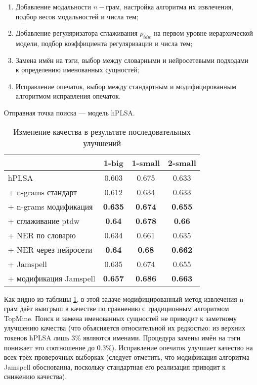 \begin{enumerate}
    \item Добавление модальности $n-$грам, настройка алгоритма их извлечения, подбор весов модальностей и числа тем;
    \item Добавление регуляризатора сглаживания $p_{tdw}$ на первом уровне иерархической модели, подбор коэффициента регуляризации и числа тем;
    \item Замена имён на тэги, выбор между словарными и нейросетевыми подходами к определению именованных сущностей;
    \item Исправление опечаток, выбор между стандартным и модифицированным алгоритмом исправления опечаток.
\end{enumerate}

Отправная точка поиска --- модель hPLSA. 

\begin{table}[!h]
    \centering
\begin{tabular}{p{2.7cm}|c|c|c}
    \hline
    & 1-big            & 1-small            & 2-small            \\ \hline
    hPLSA         & 0.603          & 0.675          & 0.633          \\
\hline \hline
    + n-grams стандарт & 0.612 & 0.634 & 0.633 \\
    + n-grams модификация & \textbf{0.635} & \textbf{0.674} & \textbf{0.655} \\
\hline \hline
    + сглаживание ptdw & \textbf{0.64} & \textbf{0.678} & \textbf{0.66} \\
\hline \hline
    + NER по словарю & 0.634         & 0.661         & 0.635 \\
    + NER через нейросети & \textbf{0.64} & \textbf{0.68} & \textbf{0.662} \\
\hline \hline
    + Jamspell  & {0.635} & {0.674} &  {0.655} \\  
    + модификация Jamspell & \textbf{0.657} & \textbf{0.686} & \textbf{0.663} \\  \hline 
\end{tabular}
    \caption{Изменение качества в результате последовательных улучшений}
    \label{nlp_techniques}
\end{table}

Как видно из таблицы \ref{nlp_techniques}, в этой задаче модифицированный метод извлечения n-грам даёт выигрыш в качестве по сравнению с традиционным алгоритмом TopMine. Поиск и замена именованных сущностей не приводит к заметному улучшению качества (что объясняется относительной их редкостью: из верхних токенов hPLSA лишь $3\%$ являются именами. Процедура замены имён на тэги понижает это соотношение до $0.3\%$). Исправление опечаток улучшает качество на всех трёх проверочных выборках (следует отметить, что модификация алгоритма Jamspell обоснованна, поскольку стандартная его реализация приводит к снижению качества).

